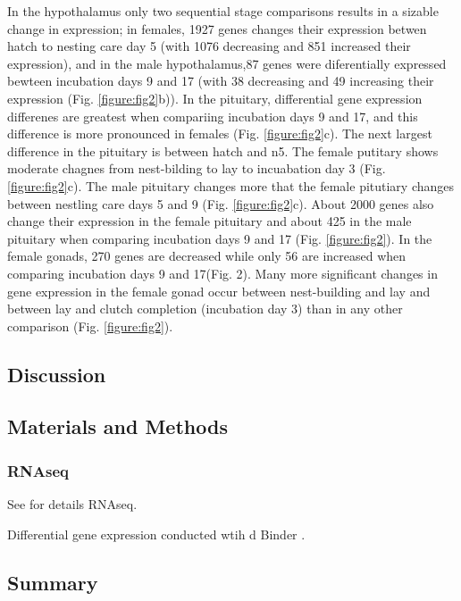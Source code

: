 In the hypothalamus only two sequential stage comparisons results in a
sizable change in expression; in females, 1927 genes changes their
expression betwen hatch to nesting care day 5 (with 1076 decreasing and
851 increased their expression), and in the male hypothalamus,87 genes
were diferentially expressed bewteen incubation days 9 and 17 (with 38
decreasing and 49 increasing their expression (Fig.
\ref{figure:fig2}b)). In the pituitary, differential gene expression
differenes are greatest when compariing incubation days 9 and 17, and
this difference is more pronounced in females (Fig. \ref{figure:fig2}c).
The next largest difference in the pituitary is between hatch and n5.
The female putitary shows moderate chagnes from nest-bilding to lay to
incuabation day 3 (Fig. \ref{figure:fig2}c). The male pituitary changes
more that the female pitutiary changes between nestling care days 5 and
9 (Fig. \ref{figure:fig2}c). About 2000 genes also change their
expression in the female pituitary and about 425 in the male pituitary
when comparing incubation days 9 and 17 (Fig. \ref{figure:fig2}). In the
female gonads, 270 genes are decreased while only 56 are increased when
comparing incubation days 9 and 17(Fig. 2). Many more significant
changes in gene expression in the female gonad occur between
nest-building and lay and between lay and clutch completion (incubation
day 3) than in any other comparison (Fig. \ref{figure:fig2}).

\hypertarget{discussion}{%
\subsection{Discussion}\label{discussion}}

\hypertarget{materials-and-methods}{%
\subsection{Materials and Methods}\label{materials-and-methods}}

\hypertarget{rnaseq}{%
\subsubsection{RNAseq}\label{rnaseq}}

See \citet{Lang2019} for details RNAseq.

Differential gene expression conducted wtih d Binder
\citep{project_jupyter-proc-scipy-2018, Love2014, Wilke2016}.

\hypertarget{summary}{%
\subsection{Summary}\label{summary}}

